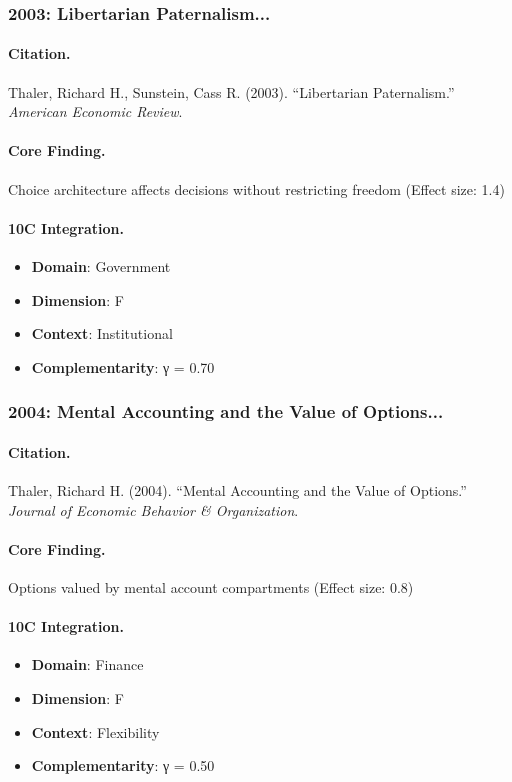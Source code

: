 \subsubsection{2003: Libertarian Paternalism...}

\paragraph{Citation.}
Thaler, Richard H., Sunstein, Cass R. (2003). ``Libertarian Paternalism.''
\textit{American Economic Review}.

\paragraph{Core Finding.}
Choice architecture affects decisions without restricting freedom (Effect size: 1.4)

\paragraph{10C Integration.}
\begin{itemize}[nosep]
  \item \textbf{Domain}: Government
  \item \textbf{Dimension}: F
  \item \textbf{Context}: Institutional
  \item \textbf{Complementarity}: γ = 0.70
\end{itemize}

\subsubsection{2004: Mental Accounting and the Value of Options...}

\paragraph{Citation.}
Thaler, Richard H. (2004). ``Mental Accounting and the Value of Options.''
\textit{Journal of Economic Behavior & Organization}.

\paragraph{Core Finding.}
Options valued by mental account compartments (Effect size: 0.8)

\paragraph{10C Integration.}
\begin{itemize}[nosep]
  \item \textbf{Domain}: Finance
  \item \textbf{Dimension}: F
  \item \textbf{Context}: Flexibility
  \item \textbf{Complementarity}: γ = 0.50
\end{itemize}

